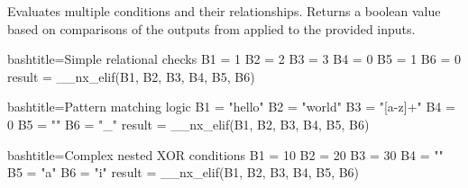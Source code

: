 \begin{NexMainBox}
	\begin{NexMainBox}
		Evaluates multiple conditions and their relationships. Returns a boolean value based on comparisons of the outputs from  applied to the provided inputs.
	\end{NexMainBox}
	\begin{NexMainBox}
	\begin{NexListDark}
	\end{NexListDark}
	\end{NexMainBox}
\end{NexMainBox}

\begin{NexCodeBox}{bash}{title={Simple relational checks}}
	B1 = 1
	B2 = 2
	B3 = 3
	B4 = 0
	B5 = 1
	B6 = 0
	result = __nx_elif(B1, B2, B3, B4, B5, B6)
\end{NexCodeBox}

\begin{NexCodeBox}{bash}{title={Pattern matching logic}}
	B1 = "hello"
	B2 = "world"
	B3 = "[a-z]+"
	B4 = 0
	B5 = ""
	B6 = "_"
	result = __nx_elif(B1, B2, B3, B4, B5, B6)
\end{NexCodeBox}

\begin{NexCodeBox}{bash}{title={Complex nested XOR conditions}}
	B1 = 10
	B2 = 20
	B3 = 30
	B4 = ""
	B5 = "a"
	B6 = "i"
	result = __nx_elif(B1, B2, B3, B4, B5, B6)
\end{NexCodeBox}

